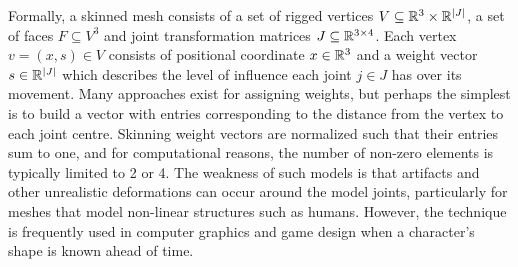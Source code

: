 \begin{definition}

Formally, a skinned mesh consists of a set of rigged vertices $V \subseteq {\mathbb{R}^{3}} \times {\mathbb{R}^{|J|}}$, a set of faces $F \subseteq V^3$ and joint transformation matrices $J \subseteq {\mathbb{R}^{3 \times 4}}$. Each vertex $v = (x, s) \in V$ consists of positional coordinate $x \in {\mathbb{R}^{3}}$ and a weight vector $s \in {\mathbb{R}^{|J|}}$ which describes the level of influence each joint $j \in J$ has over its movement. Many approaches exist for assigning weights, but perhaps the simplest is to build a vector with entries corresponding to the distance from the vertex to each joint centre. Skinning weight vectors are normalized such that their entries sum to one, and for computational reasons, the number of non-zero elements is typically limited to 2 or 4. The weakness of such models is that artifacts and other unrealistic deformations can occur around the model joints, particularly for meshes that model non-linear structures such as humans. However, the technique is frequently used in computer graphics and game design when a character's shape is known ahead of time.



\end{definition}
